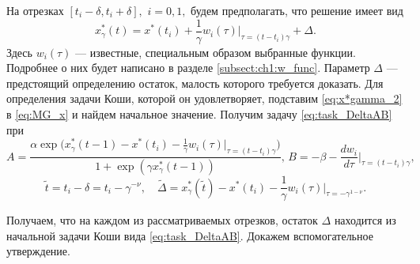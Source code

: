 На отрезках $[t_i - \delta, t_i + \delta],$ $i=0, 1,$ будем предполагать, что решение имеет вид
%
\begin{equation}
    \label{eq:x*gamma_2}
    x^*_\gamma(t) = x^*(t_i) + \frac{1}{\gamma}w_i(\tau)|_{\tau=(t-t_i)\gamma} + \Delta.
\end{equation}
%
Здесь $w_i(\tau)$ --- известные, специальным образом выбранные функции. Подробнее о них будет написано в разделе \ref{subsect:ch1:w_func}. Параметр $\Delta$ --- предстоящий определению остаток, малость которого требуется доказать. Для определения задачи Коши, которой он удовлетворяет, подставим \eqref{eq:x*gamma_2} в \eqref{eq:MG_x} и найдем начальное значение. Получим задачу \eqref{eq:task_DeltaAB} при
\begin{equation}
    \label{AB_eq:x*gamma_2}
    A=\frac{\alpha\exp\big(x_{\gamma}^*(t-1)-x^*(t_i)-\frac{1}{\gamma}w_i(\tau)|_{\tau=(t-t_i)\gamma}\big)}{1+\exp(\gamma x_{\gamma}^*(t-1))},
    \,
    B=-\beta-\frac{dw_i}{d\tau}\Big|_{\tau=(t - t_i)\gamma},
\end{equation}
%
\begin{equation}\label{tilde_eq:x*gamma_2}
    \tilde{t} = t_i - \delta = t_i - \gamma^{-\nu},\quad \tilde{\Delta}=x_{\gamma}^*(\tilde{t}) - x^*(t_i) -\frac{1}{\gamma} w_i(\tau)|_{\tau = -\gamma^{1 - \nu}}.
\end{equation}

Получаем, что на каждом из рассматриваемых отрезков, остаток $\Delta$ находится из начальной задачи Коши вида \eqref{eq:task_DeltaAB}. Докажем вспомогательное утверждение.

